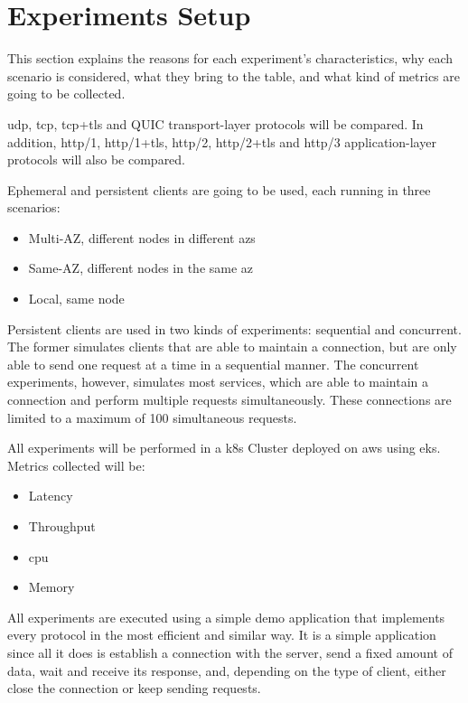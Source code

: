 \section{Experiments Setup}

This section explains the reasons for each experiment's characteristics, why each scenario is considered, what they bring to the table, and what kind of metrics are going to be collected.

\gls{udp}, \gls{tcp}, \gls{tcp}+\gls{tls} and QUIC transport-layer protocols will be compared. In addition, \gls{http}/1, \gls{http}/1+\gls{tls}, \gls{http}/2, \gls{http}/2+\gls{tls} and \gls{http}/3 application-layer protocols will also be compared.

Ephemeral and persistent clients are going to be used, each running in three scenarios:
\begin{itemize}
    \item Multi-AZ, different nodes in different \gls{az}s
    \item Same-AZ, different nodes in the same \gls{az}
    \item Local, same node
\end{itemize}

Persistent clients are used in two kinds of experiments: sequential and concurrent. The former simulates clients that are able to maintain a connection, but are only able to send one request at a time in a sequential manner. The concurrent experiments, however, simulates most services, which are able to maintain a connection and perform multiple requests simultaneously. These connections are limited to a maximum of 100 simultaneous requests.

All experiments will be performed in a \gls{k8s} Cluster deployed on \gls{aws} using \gls{eks}. Metrics collected will be:
\begin{itemize}
    \item Latency
    \item Throughput
    \item \gls{cpu}
    \item Memory
\end{itemize}

All experiments are executed using a simple demo application that implements every protocol in the most efficient and similar way. It is a simple application since all it does is establish a connection with the server, send a fixed amount of data, wait and receive its response, and, depending on the type of client, either close the connection or keep sending requests.


